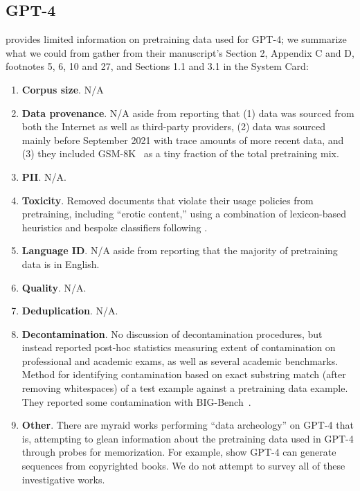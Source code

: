 \subsection{GPT-4~\citep{OpenAI2023GPT4TR}}\label{appendix:llm:gpt4} 

\citet{OpenAI2023GPT4TR} provides limited information on pretraining data used for GPT-4; we summarize what we could from gather from their manuscript's Section 2, Appendix C and D, footnotes 5, 6, 10 and 27, and Sections 1.1 and 3.1 in the System Card:


\begin{enumerate}
    \item \textbf{Corpus size}. N/A
    \item \textbf{Data provenance}. N/A aside from reporting that (1) data was sourced from both the Internet as well as third-party providers, (2) data was sourced mainly before September 2021 with trace amounts of more recent data, and (3) they included GSM-8K~\citep{Cobbe2021TrainingVT} as a tiny fraction of the total pretraining mix.
    \item \textbf{PII}. N/A.
    \item \textbf{Toxicity}. Removed documents that violate their usage policies from pretraining, including ``erotic content,'' using a combination of lexicon-based heuristics and bespoke classifiers following \citet{markov-2023-holistic-approach-undesired-content-detection}.
    \item \textbf{Language ID}. N/A aside from reporting that the majority of pretraining data is in English.
    \item \textbf{Quality}. N/A.
    \item \textbf{Deduplication}. N/A.
    \item \textbf{Decontamination}. No discussion of decontamination procedures, but instead reported post-hoc statistics measuring extent of contamination on professional and academic exams, as well as several academic benchmarks. Method for identifying contamination based on exact substring match (after removing whitespaces) of a test example against a pretraining data example. They reported some contamination with BIG-Bench~\citep{srivastava2023beyond}.
    \item \textbf{Other}. There are myraid works performing ``data archeology'' on GPT-4 that is, attempting to glean information about the pretraining data used in GPT-4 through probes for memorization. For example, \citet{Chang2023SpeakMA} show GPT-4 can generate sequences from copyrighted books. We do not attempt to survey all of these investigative works.
\end{enumerate}


